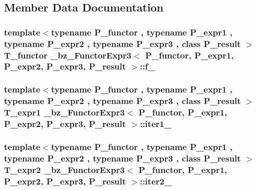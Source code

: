 \subsection{Member Data Documentation}
\hypertarget{class__bz__FunctorExpr3_ae7c7a55ab842a31a57bc0ea42bb84030}{}
\subsubsection[{f\+\_\+}]{\setlength{\rightskip}{0pt plus 5cm}template$<$typename P\+\_\+functor , typename P\+\_\+expr1 , typename P\+\_\+expr2 , typename P\+\_\+expr3 , class P\+\_\+result $>$ {\bf T\+\_\+functor} {\bf \+\_\+bz\+\_\+\+Functor\+Expr3}$<$ P\+\_\+functor, P\+\_\+expr1, P\+\_\+expr2, P\+\_\+expr3, P\+\_\+result $>$\+::f\+\_\+\hspace{0.3cm}{\ttfamily [protected]}}\label{class__bz__FunctorExpr3_ae7c7a55ab842a31a57bc0ea42bb84030}
\hypertarget{class__bz__FunctorExpr3_a3056f759a1b4e7a960d9e2e9413227f9}{}
\subsubsection[{iter1\+\_\+}]{\setlength{\rightskip}{0pt plus 5cm}template$<$typename P\+\_\+functor , typename P\+\_\+expr1 , typename P\+\_\+expr2 , typename P\+\_\+expr3 , class P\+\_\+result $>$ {\bf T\+\_\+expr1} {\bf \+\_\+bz\+\_\+\+Functor\+Expr3}$<$ P\+\_\+functor, P\+\_\+expr1, P\+\_\+expr2, P\+\_\+expr3, P\+\_\+result $>$\+::iter1\+\_\+\hspace{0.3cm}{\ttfamily [protected]}}\label{class__bz__FunctorExpr3_a3056f759a1b4e7a960d9e2e9413227f9}
\hypertarget{class__bz__FunctorExpr3_af66441a015022c06c5dcbe3ff0cb4907}{}
\subsubsection[{iter2\+\_\+}]{\setlength{\rightskip}{0pt plus 5cm}template$<$typename P\+\_\+functor , typename P\+\_\+expr1 , typename P\+\_\+expr2 , typename P\+\_\+expr3 , class P\+\_\+result $>$ {\bf T\+\_\+expr2} {\bf \+\_\+bz\+\_\+\+Functor\+Expr3}$<$ P\+\_\+functor, P\+\_\+expr1, P\+\_\+expr2, P\+\_\+expr3, P\+\_\+result $>$\+::iter2\+\_\+\hspace{0.3cm}{\ttfamily [protected]}}\label{class__bz__FunctorExpr3_af66441a015022c06c5dcbe3ff0cb4907}
\hypertarget{class__bz__FunctorExpr3_a27cdce9902cc1b453b91d1488d0ebbc8}{}
